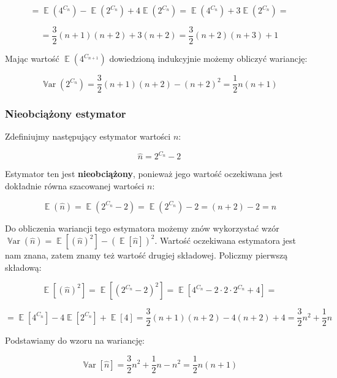 \documentclass{article}
\DeclareMathOperator{\EX}{\mathbb{E}}%
\DeclareMathOperator{\Var}{\mathbb{V}ar}%
\begin{document}
    \[ = \EX(4^{C_n}) - \EX(2^{C_n}) + 4\EX(2^{C_n}) = \EX(4^{C_n}) + 3\EX(2^{C_n}) = \]

    \[ = \frac{3}{2}(n+1)(n+2) + 3(n+2) = \frac{3}{2}(n+2)(n+3) + 1 \]

    Mając wartość $\EX(4^{C_{n+1}})$ dowiedzioną indukcyjnie możemy obliczyć wariancję:

    \[ \Var(2^{C_n}) = \frac{3}{2}(n+1)(n+2) - (n+2)^2 = \frac{1}{2}n(n+1) \]
    \subsubsection{Nieobciążony estymator}
    Zdefiniujmy następujący estymator wartości $n$:

    \[ \hat{n} = 2^{C_n} - 2 \]

    Estymator ten jest \textbf{nieobciążony}, ponieważ jego wartość oczekiwana jest dokładnie równa szacowanej wartości $n$:

    \[ \EX(\hat{n}) = \EX(2^{C_n} - 2) = \EX(2^{C_n}) - 2 = (n + 2) - 2 = n \]

    Do obliczenia wariancji tego estymatora możemy znów wykorzystać wzór $\Var(\hat{n}) = \EX[(\hat{n})^2] - (\EX[\hat{n}])^2$. Wartość oczekiwana estymatora jest nam znana, zatem znamy też wartość drugiej składowej. Policzmy pierwszą składową:

    \[ \EX[(\hat{n})^2] = \EX[(2^{C_n}-2)^2] = \EX[4^{C_n} - 2 \cdot 2 \cdot 2^{C_n} + 4] = \]

    \[ = \EX[4^{C_n}] - 4\EX[2^{C_n}] + \EX[4] = \frac{3}{2}(n+1)(n+2) - 4(n+2) + 4 = \frac{3}{2}n^2 + \frac{1}{2}n \]

    Podstawiamy do wzoru na wariancję:

    \[ \Var[\hat{n}] = \frac{3}{2}n^2 + \frac{1}{2}n - n^2 = \frac{1}{2}n(n+1) \]

    
\end{document}
